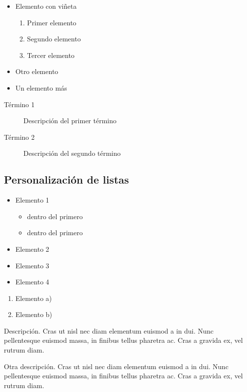 \documentclass[b5paper, 10pt]{book}
\begin{document}
\begin{itemize}
	\item Elemento con viñeta
			\begin{enumerate}
				\item Primer elemento
				\item Segundo elemento
				\item Tercer elemento
			\end{enumerate}
	\item Otro elemento
	\item Un elemento más
\end{itemize}
\noindent 
\begin{description}
	\item[Término 1] Descripción del primer término
	\item[Término 2] Descripción del segundo término
\end{description}

\subsection{Personalización de listas}

\begin{itemize}[noitemsep, topsep=0pt]
	\item Elemento 1
	\begin{itemize}[noitemsep, topsep=0pt]
		\item dentro del primero
		\item dentro del primero
	\end{itemize}
	
	\item Elemento 2
	\item Elemento 3
	\item Elemento 4
\end{itemize}

\begin{enumerate}[label=\alph*)]
	\item Elemento a)
	\item Elemento b)
\end{enumerate}

\begin{description}[style=multiline,leftmargin=3cm]
	\item[Término largo] Descripción. Cras ut nisl nec diam elementum euismod a in dui. Nunc pellentesque euismod massa, in finibus tellus pharetra ac. Cras a gravida ex, vel rutrum diam.
	\item[Corto] Otra descripción. Cras ut nisl nec diam elementum euismod a in dui. Nunc pellentesque euismod massa, in finibus tellus pharetra ac. Cras a gravida ex, vel rutrum diam.
\end{description}
\end{document}
